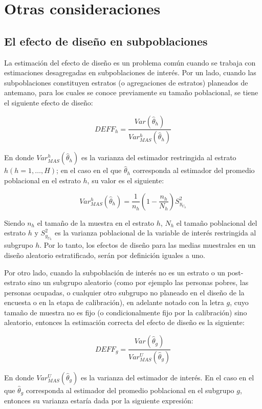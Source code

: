 \documentclass[
  12pt,
  spanish,
]{book}
\begin{document}
\hypertarget{otras-consideraciones}{%
\section{Otras consideraciones}\label{otras-consideraciones}}

\hypertarget{el-efecto-de-diseuxf1o-en-subpoblaciones}{%
\subsection{El efecto de diseño en subpoblaciones}\label{el-efecto-de-diseuxf1o-en-subpoblaciones}}

La estimación del efecto de diseño es un problema común cuando se trabaja con estimaciones desagregadas en subpoblaciones de interés. Por un lado, cuando las subpoblaciones constituyen estratos (o agregaciones de estratos) planeados de antemano, para los cuales se conoce previamente su tamaño poblacional, se tiene el siguiente efecto de diseño:

\[
DEFF_h= \frac{Var (\hat\theta_h) }{Var_{MAS}^h(\hat\theta_h) }
\]

En donde \(Var_{MAS}^h(\hat\theta_h)\) es la varianza del estimador restringida al estrato \(h (h=1,\ldots, H)\); en el caso en el que \(\hat\theta_h\) corresponda al estimador del promedio poblacional en el estrato \(h\), su valor es el siguiente:

\[
Var_{MAS}^h(\hat\theta_h)=\frac{1}{n_h}\left(1-\frac{n_h}{N_h}\right)S^2_{y_{U_h}}
\]

Siendo \(n_h\) el tamaño de la muestra en el estrato \(h\), \(N_h\) el tamaño poblacional del estrato \(h\) y \(S^2_{y_{U_h}}\) es la varianza poblacional de la variable de interés restringida al subgrupo \(h\). Por lo tanto, los efectos de diseño para las medias muestrales en un diseño aleatorio estratificado, serán por definición iguales a uno.

Por otro lado, cuando la subpoblación de interés no es un estrato o un post-estrato sino un subgrupo aleatorio (como por ejemplo las personas pobres, las personas ocupadas, o cualquier otro subgrupo no planeado en el diseño de la encuesta o en la etapa de calibración), en adelante notado con la letra \(g\), cuyo tamaño de muestra no es fijo (o condicionalmente fijo por la calibración) sino aleatorio, entonces la estimación correcta del efecto de diseño es la siguiente:

\[
DEFF_g = \frac{Var (\hat\theta_g) }{Var_{MAS}^U(\hat\theta_g) }
\]

En donde \(Var_{MAS}^U(\hat\theta_g)\) es la varianza del estimador de interés. En el caso en el que \(\hat\theta_g\) corresponda al estimador del promedio poblacional en el subgrupo \(g\), entonces su varianza estaría dada por la siguiente expresión:
\end{document}

